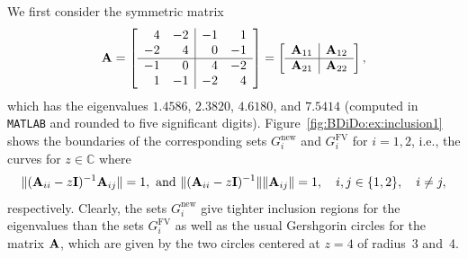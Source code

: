 \begin{example}\label{ex:BDiDo:inclusion}{\textrm
We first consider the symmetric matrix
\begin{equation}\label{eq:BDiDo:ELNmatrix1}
\mathbf{A}=
\left[ \begin{array}{rr|rr}
4	& -2	& -1 & 1	\\
-2	&	4	&  0 & -1	\\ \hline
-1	& 0	&	4	&-2	\\
1	& -1	& -2	& 4
\end{array} \right]
=
\left[ \begin{array}{c|c}
\mathbf{A}_{11}	& \mathbf{A}_{12}	\\ \hline
\mathbf{A}_{21}	& \mathbf{A}_{22}
\end{array} \right],
\end{equation}
which has the eigenvalues $1.4586$, $2.3820$, $4.6180$, and $7.5414$
(computed in \textnormal{\texttt{MATLAB}} and rounded to five significant
digits). \textnormal{Figure~\ref{fig:BDiDo:ex:inclusion1}}
shows the boundaries of the corresponding sets $G_i^{\text{new}}$ and
$G_i^{\text{FV}}$ for $i=1,2$, i.e., the curves for $z\in {\mathbb C}$ where
%
%
\begin{equation*}
\| (\mathbf{A}_{ii}-z \mathbf{I})^{-1} \mathbf{A}_{ij} \|=1,\text{ and }
\| (\mathbf{A}_{ii}-z \mathbf{I})^{-1}\|\| \mathbf{A}_{ij} \|=1,
\quad i,j\in\{1,2\},\quad i\neq j,
\end{equation*}
%
respectively. Clearly, the sets $G_i^{\text{new}}$ give tighter inclusion
regions for the eigenvalues than the sets $G_i^{\text{FV}}$ as well as the
usual Gershgorin circles for the matrix $\mathbf{A}$, which are given by the two
circles centered at $z=4$ of radius~3 and~4.

}
\end{example}
